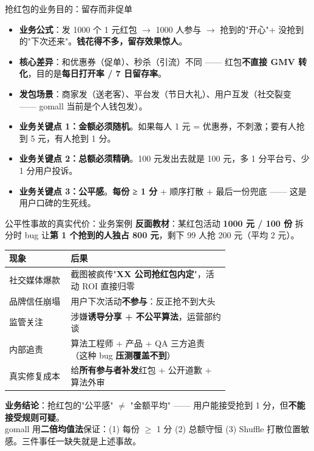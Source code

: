 \documentclass[aspectratio=169,11pt]{beamer}
\begin{document}
\begin{frame}[shrink]{抢红包的业务目的：留存而非促单}
\begin{itemize}
  \item \textbf{业务公式}：发 1000 个 1 元红包 $\to$ 1000 人参与 $\to$ 抢到的"开心"+ 没抢到的"下次还来"。\textbf{钱花得不多，留存效果惊人}。
  \item \textbf{核心差异}：和优惠券（促单）、秒杀（引流）不同 —— 红包\textbf{不直接 GMV 转化}，目的是\textbf{每日打开率 / 7 日留存率}。
  \item \textbf{发包场景}：商家发（送老客）、平台发（节日大礼）、用户互发（社交裂变 —— gomall 当前是个人钱包发）。
  \item \textbf{业务关键点 1：金额必须随机}。如果每人 1 元 = 优惠券，不刺激；要有人抢到 5 元，有人抢到 1 分。
  \item \textbf{业务关键点 2：总额必须精确}。100 元发出去就是 100 元，多 1 分平台亏、少 1 分用户投诉。
  \item \textbf{业务关键点 3：公平感}。\textbf{每份 ≥ 1 分} + 顺序打散 + 最后一份兜底 —— 这是用户口碑的生死线。
\end{itemize}
\end{frame}

\begin{frame}[shrink]{公平性事故的真实代价：业务案例}
\textbf{反面教材}：某红包活动 \textbf{1000 元 / 100 份} 拆分时 bug 让\textbf{第 1 个抢到的人独占 800 元}，剩下 99 人抢 200 元（平均 2 元）。

\vspace{1mm}
\begin{tabular}{@{}lp{0.72\linewidth}@{}}
\toprule
现象 & 后果 \\
\midrule
社交媒体爆款 & 截图被疯传"\textbf{XX 公司抢红包内定}"，活动 ROI 直接归零 \\
品牌信任崩塌 & 用户下次活动\textbf{不参与}：反正抢不到大头 \\
监管关注     & 涉嫌\textbf{诱导分享 + 不公平算法}，运营部约谈 \\
内部追责     & 算法工程师 + 产品 + QA 三方追责（这种 bug \textbf{压测覆盖不到}） \\
真实修复成本 & 给\textbf{所有参与者补发}红包 + 公开道歉 + 算法外审 \\
\bottomrule
\end{tabular}
\vspace{2mm}

\small \textbf{业务结论}：抢红包的"公平感" $\neq$ "金额平均" —— 用户能接受抢到 1 分，但\textbf{不能接受规则可疑}。\\
gomall 用\textbf{二倍均值法}保证：(1) 每份 $\geq$ 1 分 (2) 总额守恒 (3) Shuffle 打散位置敏感。三件事任一缺失就是上述事故。
\end{frame}
\end{document}

